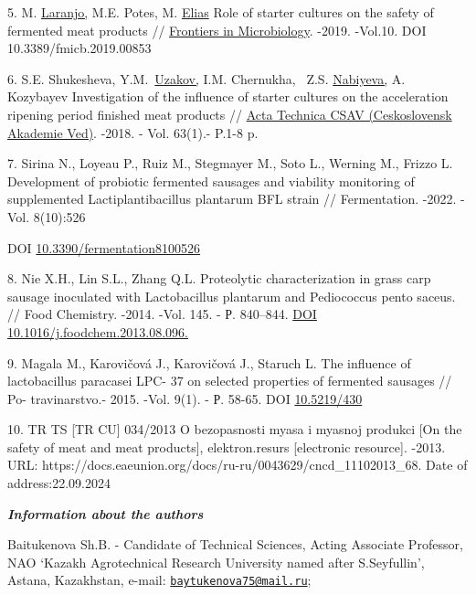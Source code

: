 5. M.
\href{https://library.kazatu.kz:2057/authid/detail.uri?origin=resultslist&authorId=7801545833&zone=}{Laranjo,}
M.E. Potes, M.
\href{https://library.kazatu.kz:2057/authid/detail.uri?origin=resultslist&authorId=35086070100&zone=}{Elias}
Role of starter cultures on the safety of fermented meat products //
\href{https://library.kazatu.kz:2057/sourceid/21100226442?origin=resultslist}{Frontiers
in Microbiology}. -2019. -Vol.10. DOI 10.3389/fmicb.2019.00853

6. S.E. Shukesheva,
Y.M.~\href{https://library.kazatu.kz:2057/authid/detail.uri?origin=resultslist&authorId=55968622400&zone=}{Uzakov,}
I.M. Chernukha, ~Z.S.
\href{https://library.kazatu.kz:2057/authid/detail.uri?origin=resultslist&authorId=56031451100&zone=}{Nabiyeva,}
A. Kozybayev Investigation of the influence of starter cultures on the
acceleration ripening period finished meat products //
\href{https://library.kazatu.kz:2057/sourceid/13884?origin=resultslist}{Acta
Technica CSAV (Ceskoslovensk Akademie Ved)}. -2018. - Vol. 63(1).- P.1-8
p.

7. Sirina N., Loyeau P., Ruiz M., Stegmayer M., Soto L., Werning M.,
Frizzo L. Development of probiotic fermented sausages and viability
monitoring of supplemented Lactiplantibacillus plantarum BFL strain //
Fermentation. -2022. -Vol. 8(10):526

DOI
\href{https://doi.org/10.3390/fermentation8100526}{10.3390/fermentation8100526}

8. Nie X.H., Lin S.L., Zhang Q.L. Proteolytic characterization in grass
carp sausage inoculated with Lactobacillus plantarum and Pediococcus
pento saceus. // Food Chemistry. -2014. -Vol. 145. - Р. 840--844.
\href{https://doi.org/10.1016/j.foodchem.2013.08.096}{DOI
10.1016/j.foodchem.2013.08.096.}

9. Magala M., Karovičová J., Karovičová J., Staruch L. The influence of
lactobacillus paracasei LPC- 37 on selected properties of fermented
sausages // Po- travinarstvo.- 2015. -Vol. 9(1). - Р. 58-65. DOI
\href{https://doi.org/10.5219/430}{10.5219/430}

10. TR TS {[}TR CU{]} 034/2013 O bezopasnosti myasa i myasnoj produkci
{[}On the safety of meat and meat products{]}, elektron.resurs
{[}electronic resource{]}. -2013. URL:
https://docs.eaeunion.org/docs/ru-ru/0043629/cncd\_11102013\_68. Date of
address:22.09.2024

\emph{{\bfseries Information about the authors}}

Baitukenova Sh.B. - Candidate of Technical Sciences, Acting Associate
Professor, NAO `Kazakh Agrotechnical Research University named after
S.Seyfullin', Astana, Kazakhstan, e-mail:
\href{mailto:baytukenova75@mail.ru}{\nolinkurl{baytukenova75@mail.ru}};


